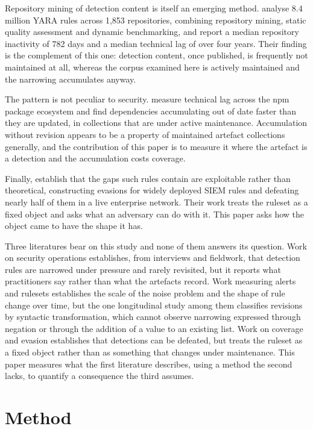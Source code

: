 Repository mining of detection content is itself an emerging method. \citet{dectot2026} analyse 8.4 million YARA rules across 1,853 repositories, combining repository mining, static quality assessment and dynamic benchmarking, and report a median repository inactivity of 782 days and a median technical lag of over four years. Their finding is the complement of this one: detection content, once published, is frequently not maintained at all, whereas the corpus examined here is actively maintained and the narrowing accumulates anyway.

The pattern is not peculiar to security. \citet{decan2018} measure technical lag across the npm package ecosystem and find dependencies accumulating out of date faster than they are updated, in collections that are under active maintenance. Accumulation without revision appears to be a property of maintained artefact collections generally, and the contribution of this paper is to measure it where the artefact is a detection and the accumulation costs coverage.

Finally, \citet{uetz2024} establish that the gaps such rules contain are exploitable rather than theoretical, constructing evasions for widely deployed SIEM rules and defeating nearly half of them in a live enterprise network. Their work treats the ruleset as a fixed object and asks what an adversary can do with it. This paper asks how the object came to have the shape it has.

Three literatures bear on this study and none of them answers its question. Work on security operations establishes, from interviews and fieldwork, that detection rules are narrowed under pressure and rarely revisited, but it reports what practitioners say rather than what the artefacts record. Work measuring alerts and rulesets establishes the scale of the noise problem and the shape of rule change over time, but the one longitudinal study among them classifies revisions by syntactic transformation, which cannot observe narrowing expressed through negation or through the addition of a value to an existing list. Work on coverage and evasion establishes that detections can be defeated, but treats the ruleset as a fixed object rather than as something that changes under maintenance. This paper measures what the first literature describes, using a method the second lacks, to quantify a consequence the third assumes.

\section{Method}
\label{sec:method}

